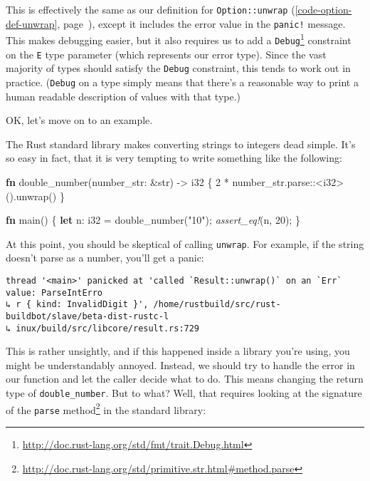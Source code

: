 \documentclass[a4paper,]{book}
\renewcommand*{\hyperref}[2][\ar]{%
  \def\ar{#2}%
  #2 (\autoref{#1}, page~\pageref{#1})}
\newenvironment{Shaded}{\begin{snugshade}}{\end{snugshade}}
\newcommand{\KeywordTok}[1]{\textcolor[rgb]{0.13,0.29,0.53}{\textbf{{#1}}}}
\newcommand{\DataTypeTok}[1]{\textcolor[rgb]{0.13,0.29,0.53}{{#1}}}
\newcommand{\DecValTok}[1]{\textcolor[rgb]{0.00,0.00,0.81}{{#1}}}
\newcommand{\StringTok}[1]{\textcolor[rgb]{0.31,0.60,0.02}{{#1}}}
\newcommand{\PreprocessorTok}[1]{\textcolor[rgb]{0.56,0.35,0.01}{\textit{{#1}}}}
\newcommand{\NormalTok}[1]{{#1}}
\renewcommand{\href}[2]{#2\footnote{\url{#1}}}
\let\oldparagraph\paragraph
\renewcommand{\paragraph}[1]{\oldparagraph{#1}\mbox{}}
\begin{document}
This is effectively the same as our
\hyperref[code-option-def-unwrap]{definition for
\texttt{Option::unwrap}}, except it includes the error value in the
\texttt{panic!} message. This makes debugging easier, but it also
requires us to add a
\href{http://doc.rust-lang.org/std/fmt/trait.Debug.html}{\texttt{Debug}}
constraint on the \texttt{E} type parameter (which represents our error
type). Since the vast majority of types should satisfy the
\texttt{Debug} constraint, this tends to work out in practice.
(\texttt{Debug} on a type simply means that there's a reasonable way to
print a human readable description of values with that type.)

OK, let's move on to an example.

\hyperdef{}{parsing-integers}{\paragraph{Parsing
integers}\label{parsing-integers}}

The Rust standard library makes converting strings to integers dead
simple. It's so easy in fact, that it is very tempting to write
something like the following:

\begin{Shaded}
\begin{Highlighting}[]
\KeywordTok{fn} \NormalTok{double_number(number_str: &}\DataTypeTok{str}\NormalTok{) -> }\DataTypeTok{i32} \NormalTok{\{}
    \DecValTok{2} \NormalTok{* number_str.parse::<}\DataTypeTok{i32}\NormalTok{>().unwrap()}
\NormalTok{\}}

\KeywordTok{fn} \NormalTok{main() \{}
    \KeywordTok{let} \NormalTok{n: }\DataTypeTok{i32} \NormalTok{= double_number(}\StringTok{"10"}\NormalTok{);}
    \PreprocessorTok{assert_eq!}\NormalTok{(n, }\DecValTok{20}\NormalTok{);}
\NormalTok{\}}
\end{Highlighting}
\end{Shaded}

At this point, you should be skeptical of calling \texttt{unwrap}. For
example, if the string doesn't parse as a number, you'll get a panic:

\begin{verbatim}
thread '<main>' panicked at 'called `Result::unwrap()` on an `Err` value: ParseIntErro
↳ r { kind: InvalidDigit }', /home/rustbuild/src/rust-buildbot/slave/beta-dist-rustc-l
↳ inux/build/src/libcore/result.rs:729
\end{verbatim}

This is rather unsightly, and if this happened inside a library you're
using, you might be understandably annoyed. Instead, we should try to
handle the error in our function and let the caller decide what to do.
This means changing the return type of \texttt{double\_number}. But to
what? Well, that requires looking at the signature of the
\href{http://doc.rust-lang.org/std/primitive.str.html\#method.parse}{\texttt{parse}
method} in the standard library:
\end{document}
